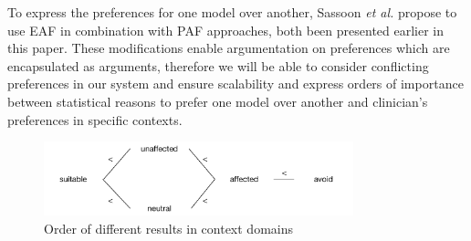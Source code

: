 To express the preferences for one model over another, Sassoon \textit{et al.} \cite{sassoon2016} propose to use \gls{EAF} \cite{Modgil2009} in combination with \gls{PAF} \cite{amgoud,amgoud2000} approaches, both been presented earlier in this paper. These modifications enable argumentation on preferences which are encapsulated as arguments, therefore we will be able to consider conflicting preferences in our system and ensure scalability and express orders of importance between statistical reasons to prefer one model over another and clinician's preferences in specific contexts.

\begin{figure}[h]

\centering
\includegraphics[width=0.8\textwidth]{figures/order_context_domain}
\caption{Order of different results in context domains }
\end{figure}

